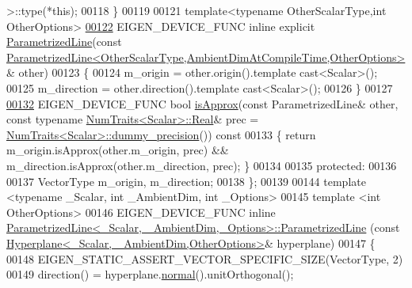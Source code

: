\begin{DoxyCode}
       >::type(*\textcolor{keyword}{this});
00118   \}
00119 
00121   \textcolor{keyword}{template}<\textcolor{keyword}{typename} OtherScalarType,\textcolor{keywordtype}{int} OtherOptions>
\hyperlink{group___geometry___module_a69aed1a96062648d4e61dce3b5fb896f}{00122}   EIGEN\_DEVICE\_FUNC \textcolor{keyword}{inline} \textcolor{keyword}{explicit} \hyperlink{group___geometry___module_a69aed1a96062648d4e61dce3b5fb896f}{ParametrizedLine}(\textcolor{keyword}{const} 
      \hyperlink{group___geometry___module_class_eigen_1_1_parametrized_line}{ParametrizedLine<OtherScalarType,AmbientDimAtCompileTime,OtherOptions>}
      & other)
00123   \{
00124     m\_origin = other.origin().template cast<Scalar>();
00125     m\_direction = other.direction().template cast<Scalar>();
00126   \}
00127 
\hyperlink{group___geometry___module_a27a86c54f66a622847470f79aec4ea2f}{00132}   EIGEN\_DEVICE\_FUNC \textcolor{keywordtype}{bool} \hyperlink{group___geometry___module_a27a86c54f66a622847470f79aec4ea2f}{isApprox}(\textcolor{keyword}{const} ParametrizedLine& other, \textcolor{keyword}{const} \textcolor{keyword}{typename} 
      \hyperlink{group___core___module_struct_eigen_1_1_num_traits}{NumTraits<Scalar>::Real}& prec = 
      \hyperlink{group___core___module_struct_eigen_1_1_num_traits}{NumTraits<Scalar>::dummy\_precision}())\textcolor{keyword}{ const}
00133 \textcolor{keyword}{  }\{ \textcolor{keywordflow}{return} m\_origin.isApprox(other.m\_origin, prec) && m\_direction.isApprox(other.m\_direction, prec); \}
00134 
00135 \textcolor{keyword}{protected}:
00136 
00137   VectorType m\_origin, m\_direction;
00138 \};
00139 
00144 \textcolor{keyword}{template} <\textcolor{keyword}{typename} \_Scalar, \textcolor{keywordtype}{int} \_AmbientDim, \textcolor{keywordtype}{int} \_Options>
00145 \textcolor{keyword}{template} <\textcolor{keywordtype}{int} OtherOptions>
00146 EIGEN\_DEVICE\_FUNC \textcolor{keyword}{inline} 
      \hyperlink{group___geometry___module_a7c23f36d93cf3b3c2b37fd9f9eda5685}{ParametrizedLine<\_Scalar, \_AmbientDim,\_Options>::ParametrizedLine}
      (\textcolor{keyword}{const} \hyperlink{group___geometry___module_class_eigen_1_1_hyperplane}{Hyperplane<\_Scalar, \_AmbientDim,OtherOptions>}& 
      hyperplane)
00147 \{
00148   EIGEN\_STATIC\_ASSERT\_VECTOR\_SPECIFIC\_SIZE(VectorType, 2)
00149   direction() = hyperplane.\hyperlink{group___geometry___module_ad3da930fc7025604f2f174651089b2a8}{normal}().unitOrthogonal();

\end{DoxyCode}
